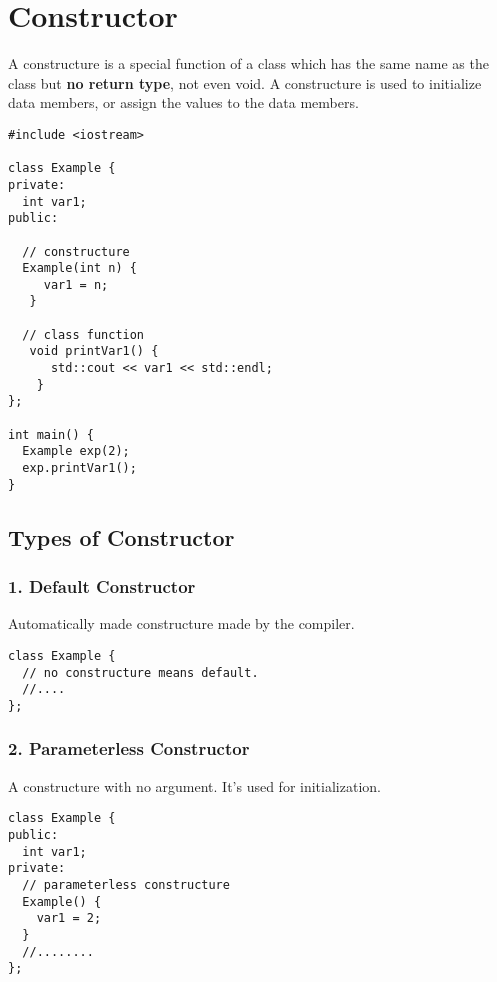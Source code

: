 \documentclass[11pt]{article}
\author{ok}
\date{\today}
\title{}
\begin{document}
\tableofcontents

\section{Constructor}
\label{sec:org3a7f0ed}
A constructure is a special function of a class which has the same name as the class but \textbf{no return type}, not even void.
A constructure is used to initialize data members, or assign the values to the data members.
\begin{verbatim}
#include <iostream>

class Example {
private:
  int var1;
public:

  // constructure
  Example(int n) {
     var1 = n;
   }

  // class function
   void printVar1() {
      std::cout << var1 << std::endl;
    }
};

int main() {
  Example exp(2);
  exp.printVar1();
}
\end{verbatim}
\subsection{Types of Constructor}
\label{sec:org19aac67}
\subsubsection{1. Default Constructor}
\label{sec:orgae256a9}
Automatically made constructure made by the compiler.
\begin{verbatim}
class Example {
  // no constructure means default.
  //....
};
\end{verbatim}
\subsubsection{2. Parameterless Constructor}
\label{sec:org34fce1f}
A constructure with no argument. It's used for initialization.
\begin{verbatim}
class Example {
public:
  int var1;
private:
  // parameterless constructure
  Example() {
    var1 = 2;
  }
  //........
};
\end{verbatim}
\end{document}
